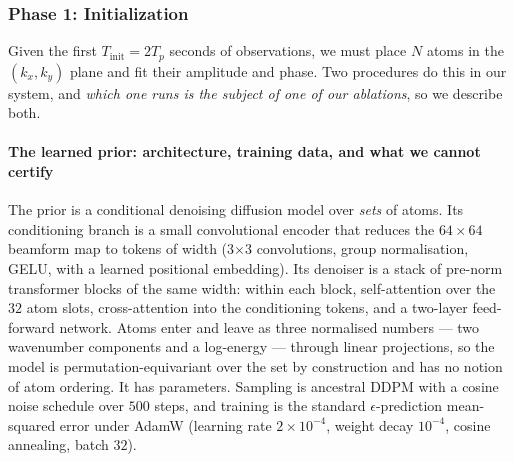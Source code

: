 \documentclass[review]{elsarticle}
\begin{document}
\subsubsection{Phase 1: Initialization}
\label{sec:init}


Given the first $T_{\text{init}} = 2 T_p$ seconds of observations, we must place
$N$ atoms in the $(k_x, k_y)$ plane and fit their amplitude and phase. Two
procedures do this in our system, and \emph{which one runs is the subject of one of
our ablations}, so we describe both.

\paragraph{The learned prior: architecture, training data, and what we cannot certify}
The prior is a conditional denoising diffusion model over \emph{sets} of atoms. Its
conditioning branch is a small convolutional encoder that reduces the
$64 \times 64$ beamform map to \PriorTokens{} tokens of width \PriorDim{}
(3$\times$3 convolutions, group normalisation, GELU, with a learned positional
embedding). Its denoiser is a stack of \PriorBlocks{} pre-norm transformer blocks
of the same width: within each block, self-attention over the $32$ atom slots,
cross-attention into the conditioning tokens, and a two-layer feed-forward network.
Atoms enter and leave as three normalised numbers --- two wavenumber components and
a log-energy --- through linear projections, so the model is permutation-equivariant
over the set by construction and has no notion of atom ordering. It has
\PriorParams{} parameters. Sampling is ancestral DDPM with a cosine noise schedule
over $500$ steps, and training is the standard $\epsilon$-prediction mean-squared
error under AdamW (learning rate $2\times 10^{-4}$, weight decay $10^{-4}$, cosine
annealing, batch $32$).
\end{document}
